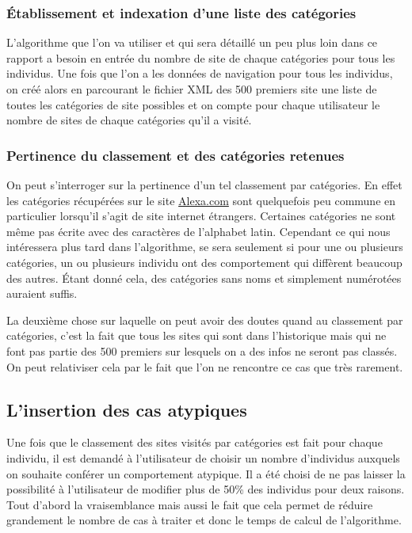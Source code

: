 \documentclass[a4paper, 11pt]{article}
\begin{document}
\subsubsection{Établissement et indexation d'une liste des catégories}

L'algorithme que l'on va utiliser et qui sera détaillé un peu plus loin dans ce rapport a besoin en entrée du nombre de site de chaque catégories pour tous les individus. Une fois que l'on a les données de navigation pour tous les individus, on créé alors en parcourant le fichier XML des 500 premiers site une liste de toutes les catégories de site possibles et on compte pour chaque utilisateur le nombre de sites de chaque catégories qu'il a visité.

\subsubsection{Pertinence du classement et des catégories retenues}

On peut s'interroger sur la pertinence d'un tel classement par catégories. En effet les catégories récupérées sur le site \href{http://www.alexa.com/siteinfo}{Alexa.com} sont quelquefois peu commune en particulier lorsqu'il s'agit de site internet étrangers. Certaines catégories ne sont même pas écrite avec des caractères de l'alphabet latin. Cependant ce qui nous intéressera plus tard dans l'algorithme, se sera seulement si pour une ou plusieurs catégories, un ou plusieurs individu ont des comportement qui diffèrent beaucoup des autres. Étant donné cela, des catégories sans noms et simplement numérotées auraient suffis.

La deuxième chose sur laquelle on peut avoir des doutes quand au classement par catégories, c'est la fait que tous les sites qui sont dans l'historique mais qui ne font pas partie des 500 premiers sur lesquels on a des infos ne seront pas classés. On peut relativiser cela par le fait que l'on ne rencontre ce cas que très rarement.

\subsection{L'insertion des cas atypiques}

Une fois que le classement des sites visités par catégories est fait pour chaque individu, il est demandé à l'utilisateur de choisir un nombre d'individus auxquels on souhaite conférer un comportement atypique. Il a été choisi de ne pas laisser la possibilité à l'utilisateur de modifier plus de 50\% des individus pour deux raisons. Tout d'abord la vraisemblance mais aussi le fait que cela permet de réduire grandement le nombre de cas à traiter et donc le temps de calcul de l'algorithme.
\end{document}
